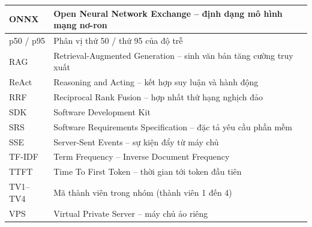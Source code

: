 \begin{longtable}{|p{3.0cm}|p{11.6cm}|}
        ONNX & Open Neural Network Exchange -- định dạng mô hình mạng nơ-ron \\ \hline
        p50 / p95 & Phân vị thứ 50 / thứ 95 của độ trễ \\ \hline
        RAG & Retrieval-Augmented Generation -- sinh văn bản tăng cường truy xuất \\ \hline
        ReAct & Reasoning and Acting -- kết hợp suy luận và hành động \\ \hline
        RRF & Reciprocal Rank Fusion -- hợp nhất thứ hạng nghịch đảo \\ \hline
        SDK & Software Development Kit \\ \hline
        SRS & Software Requirements Specification -- đặc tả yêu cầu phần mềm \\ \hline
        SSE & Server-Sent Events -- sự kiện đẩy từ máy chủ \\ \hline
        TF-IDF & Term Frequency -- Inverse Document Frequency \\ \hline
        TTFT & Time To First Token -- thời gian tới token đầu tiên \\ \hline
        TV1--TV4 & Mã thành viên trong nhóm (thành viên 1 đến 4) \\ \hline
        VPS & Virtual Private Server -- máy chủ ảo riêng \\ \hline
\end{longtable}
\endgroup
